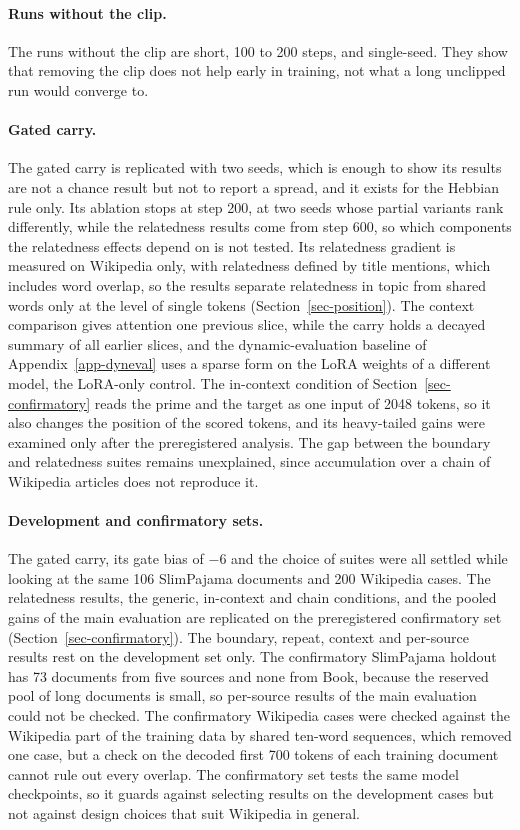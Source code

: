 \documentclass[12pt,a4paper]{report}
\begin{document}
\paragraph{Runs without the clip.} The runs without the clip are short, 100 to 200 steps, and single-seed. They show that removing the clip does not help early in training, not what a long unclipped run would converge to.

\paragraph{Gated carry.} The gated carry is replicated with two seeds, which is enough to show its results are not a chance result but not to report a spread, and it exists for the Hebbian rule only. Its ablation stops at step 200, at two seeds whose partial variants rank differently, while the relatedness results come from step 600, so which components the relatedness effects depend on is not tested. Its relatedness gradient is measured on Wikipedia only, with relatedness defined by title mentions, which includes word overlap, so the results separate relatedness in topic from shared words only at the level of single tokens (Section~\ref{sec-position}). The context comparison gives attention one previous slice, while the carry holds a decayed summary of all earlier slices, and the dynamic-evaluation baseline of Appendix~\ref{app-dyneval} uses a sparse form on the LoRA weights of a different model, the LoRA-only control. The in-context condition of Section~\ref{sec-confirmatory} reads the prime and the target as one input of 2048 tokens, so it also changes the position of the scored tokens, and its heavy-tailed gains were examined only after the preregistered analysis. The gap between the boundary and relatedness suites remains unexplained, since accumulation over a chain of Wikipedia articles does not reproduce it.

\paragraph{Development and confirmatory sets.} The gated carry, its gate bias of $-6$ and the choice of suites were all settled while looking at the same 106 SlimPajama documents and 200 Wikipedia cases. The relatedness results, the generic, in-context and chain conditions, and the pooled gains of the main evaluation are replicated on the preregistered confirmatory set (Section~\ref{sec-confirmatory}). The boundary, repeat, context and per-source results rest on the development set only. The confirmatory SlimPajama holdout has 73 documents from five sources and none from Book, because the reserved pool of long documents is small, so per-source results of the main evaluation could not be checked. The confirmatory Wikipedia cases were checked against the Wikipedia part of the training data by shared ten-word sequences, which removed one case, but a check on the decoded first 700 tokens of each training document cannot rule out every overlap. The confirmatory set tests the same model checkpoints, so it guards against selecting results on the development cases but not against design choices that suit Wikipedia in general.
\end{document}
